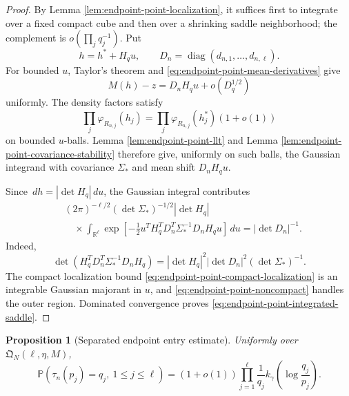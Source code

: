 \documentclass[11pt]{article}
\newtheorem{proposition}[theorem]{Proposition}
\theoremstyle{remark}
\newcommand{\Pp}{\mathbb P}
\newcommand{\diag}{\operatorname{diag}}
\newcommand{\dd}{\,d}
\begin{document}
\begin{proof}
By Lemma \ref{lem:endpoint-point-localization}, it suffices first to integrate
over a fixed compact cube and then over a shrinking saddle neighborhood; the
complement is $o(\prod_jq_j^{-1})$.  Put
\[
        h=h^*+H_qu,
        \qquad
        D_n=\diag(d_{n,1},\ldots,d_{n,\ell}).
\]
For bounded $u$, Taylor's theorem and
\eqref{eq:endpoint-point-mean-derivatives} give
\[
        M(h)-z=D_nH_qu+o(D_q^{1/2})
\tag{10.32}\label{eq:endpoint-point-mean-taylor}
\]
uniformly.  The density factors satisfy
\[
        \prod_j\varphi_{R_{n,j}}(h_j)
        =\prod_j\varphi_{R_{n,j}}(h_j^*)(1+o(1))
\]
on bounded $u$-balls.  Lemma \ref{lem:endpoint-point-llt} and Lemma
\ref{lem:endpoint-point-covariance-stability} therefore give, uniformly on
such balls, the Gaussian integrand with covariance $\Sigma_*$ and mean shift
$D_nH_qu$.

Since $\dd h=|\det H_q|\dd u$, the Gaussian integral contributes
\[
\begin{aligned}
&(2\pi)^{-\ell/2}(\det\Sigma_*)^{-1/2}|\det H_q|\\
&\quad\times
\int_{\mathbb R^\ell}
\exp\left[-\frac12u^TH_q^TD_n^T
\Sigma_*^{-1}D_nH_qu\right]\dd u
=|\det D_n|^{-1}.
\end{aligned}
\tag{10.33}\label{eq:endpoint-point-determinant-cancellation}
\]
Indeed,
\[
\det(H_q^TD_n^T\Sigma_*^{-1}D_nH_q)
=|\det H_q|^2|\det D_n|^2(\det\Sigma_*)^{-1}.
\]
The compact localization bound
\eqref{eq:endpoint-point-compact-localization} is an integrable Gaussian
majorant in $u$, and
\eqref{eq:endpoint-point-noncompact} handles the outer region.  Dominated
convergence proves \eqref{eq:endpoint-point-integrated-saddle}.
\end{proof}

\begin{proposition}[Separated endpoint entry estimate]
\label{prop:endpoint-general-entry}
Uniformly over $\mathfrak Q_N(\ell,\eta,M)$,
\[
        \Pp(\tau_n(p_j)=q_j,\ 1\le j\le\ell)
        =(1+o(1))\prod_{j=1}^\ell
        \frac1{q_j}k_\gamma\!\left(\log\frac{q_j}{p_j}\right).
\tag{10.34}\label{eq:endpoint-general-entry}
\]
\end{proposition}
\end{document}
